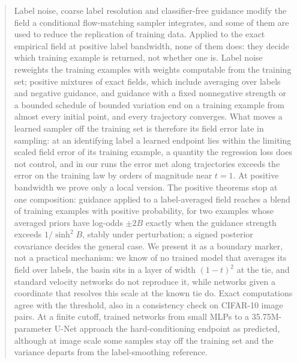 \begin{abstract}
Label noise, coarse label resolution and classifier-free guidance modify the field a conditional
flow-matching sampler integrates, and some of them are used to reduce the replication of training
data. Applied to the exact empirical field at positive label bandwidth, none of them does: they
decide which training example is returned, not whether one is. Label noise reweights the training
examples with weights computable from the training set; positive mixtures of exact fields, which
include averaging over labels and negative guidance, and guidance with a fixed nonnegative strength
or a bounded schedule of bounded variation end on a training example from almost every initial
point, and every trajectory converges. What moves a learned sampler off the training set is
therefore its field error late in sampling: at an identifying label a learned endpoint lies within
the limiting scaled field error of its training example, a quantity the regression loss does not
control, and in our runs the error met along trajectories exceeds the error on the training law by
orders of magnitude near $t=1$. At positive bandwidth we prove only a local version. The positive
theorems stop at one composition: guidance applied to a label-averaged field reaches a blend of
training examples with positive probability, for two examples whose averaged priors have log-odds
$\pm2B$ exactly when the guidance strength exceeds $1/\sinh^2B$, stably under perturbation; a signed
posterior covariance decides the general case. We present it as a boundary marker, not a practical
mechanism: we know of no trained model that averages its field over labels, the basin sits in a
layer of width $(1-t)^2$ at the tie, and standard velocity networks do not reproduce it, while
networks given a coordinate that resolves this scale at the known tie do. Exact computations agree
with the threshold, also in a consistency check on CIFAR-10 image pairs. At a finite cutoff,
trained networks from small MLPs to a 35.75M-parameter U-Net approach the hard-conditioning
endpoint as predicted, although at image scale some samples stay off the training set and the
variance departs from the label-smoothing reference.
\end{abstract}


